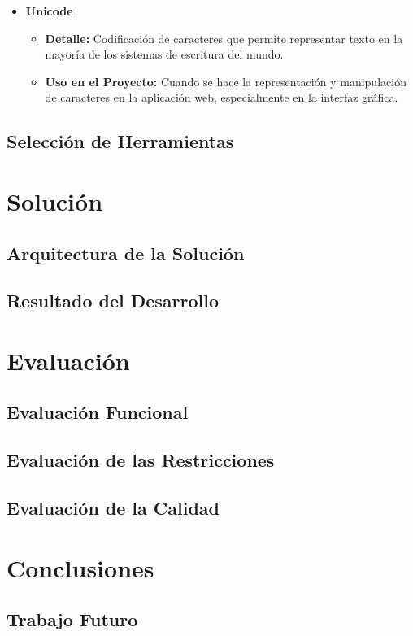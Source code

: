 \documentclass[stu, 12pt, letterpaper, donotrepeattitle, floatsintext, natbib]{apa7}
\begin{document}
\begin{itemize}
	\item \textbf{Unicode}
	\begin{itemize}
		\item \textbf{Detalle:} Codificación de caracteres que permite representar texto en la mayoría de los sistemas de escritura del mundo.
		\item \textbf{Uso en el Proyecto:} Cuando se hace la representación y manipulación de caracteres en la aplicación web, especialmente en la interfaz gráfica.
	\end{itemize}
	
\end{itemize}

\subsection{Selección de Herramientas}


\section{Solución}

\subsection{Arquitectura de la Solución}

\subsection{Resultado del Desarrollo}


\section{Evaluación}

\subsection{Evaluación Funcional}

\subsection{Evaluación de las Restricciones}

\subsection{Evaluación de la Calidad}


\section{Conclusiones}

\subsection{Trabajo Futuro}

\newpage
\renewcommand\refname{{\textbf{Referencias}}}

\end{document}
